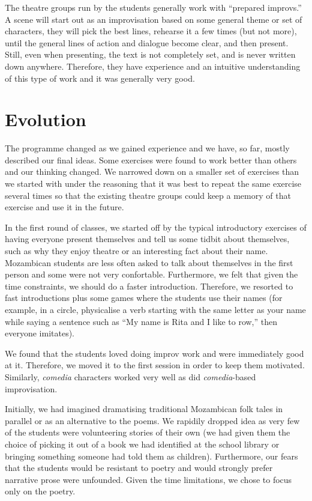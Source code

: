 \documentclass[article,twocolumn,twoside]{memoir}
\begin{document}
The theatre groups run by the students generally work with ``prepared
improvs.'' A scene will start out as an improvisation based on some general
theme or set of characters, they will pick the best lines, rehearse it a few
times (but not more), until the general lines of action and dialogue become
clear, and then present. Still, even when presenting, the text is not
completely set, and is never written down anywhere. Therefore, they have
experience and an intuitive understanding of this type of work and it was
generally very good.

\chapter{Evolution}

The programme changed as we gained experience and we have, so far, mostly
described our final ideas. Some exercises were found to work better than others
and our thinking changed. We narrowed down on a smaller set of exercises than
we started with under the reasoning that it was best to repeat the same
exercise several times so that the existing theatre groups could keep a memory
of that exercise and use it in the future.

In the first round of classes, we started off by the typical introductory
exercises of having everyone present themselves and tell us some tidbit about
themselves, such as why they enjoy theatre or an interesting fact about their
name. Mozambican students are less often asked to talk about themselves in the
first person and some were not very confortable. Furthermore, we felt that
given the time constraints, we should do a faster introduction. Therefore, we
resorted to fast introductions plus some games where the students use their
names (for example, in a circle, physicalise a verb starting with the same
letter as your name while saying a sentence such as ``My name is Rita and I
like to row,'' then everyone imitates).

We found that the students loved doing improv work and were immediately
good at it. Therefore, we moved it to the first session in order to keep them
motivated. Similarly, \textit{comedia} characters worked very well as did
\textit{comedia}-based improvisation.

Initially, we had imagined dramatising traditional Mozambican folk tales in
parallel or as an alternative to the poems. We rapidily dropped idea as very
few of the students were volunteering stories of their own (we had given them
the choice of picking it out of a book we had identified at the school library
or bringing something someone had told them as children). Furthermore, our
fears that the students would be resistant to poetry and would strongly prefer
narrative prose were unfounded. Given the time limitations, we chose to focus
only on the poetry.
\end{document}
